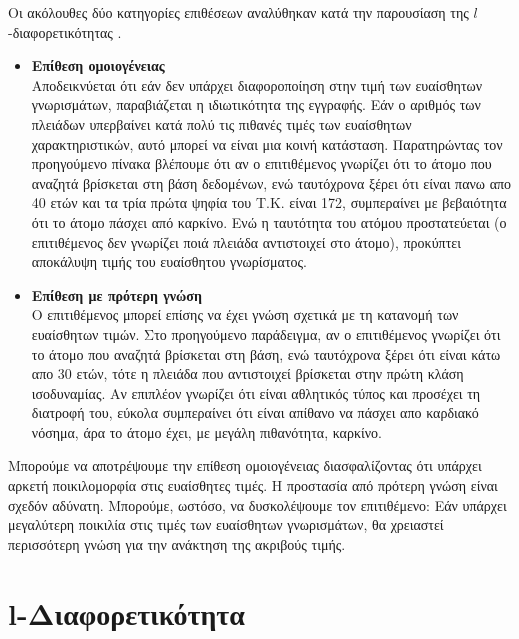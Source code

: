 Οι ακόλουθες δύο κατηγορίες επιθέσεων αναλύθηκαν κατά την παρουσίαση της $l$-διαφορετικότητας \textlatin{ \cite{machanavajjhala2006ell}}.

\begin{itemize}
    \item \textbf{Eπίθεση ομοιογένειας}\\
    Αποδεικνύεται ότι εάν δεν υπάρχει διαφοροποίηση στην τιμή των ευαίσθητων γνωρισμάτων, παραβιάζεται η ιδιωτικότητα της εγγραφής. Εάν ο αριθμός των πλειάδων υπερβαίνει κατά πολύ τις πιθανές τιμές των ευαίσθητων χαρακτηριστικών, αυτό μπορεί να είναι μια κοινή κατάσταση. Παρατηρώντας τον προηγούμενο πίνακα βλέπουμε ότι αν ο επιτιθέμενος γνωρίζει ότι το άτομο που αναζητά βρίσκεται στη βάση δεδομένων, ενώ ταυτόχρονα ξέρει ότι είναι πανω απο 40 ετών και τα τρία πρώτα ψηφία του Τ.Κ. είναι 172, συμπεραίνει με βεβαιότητα ότι το άτομο πάσχει από καρκίνο. Ενώ η ταυτότητα του ατόμου προστατεύεται (ο επιτιθέμενος δεν γνωρίζει ποιά πλειάδα αντιστοιχεί στο άτομο), προκύπτει αποκάλυψη τιμής του ευαίσθητου γνωρίσματος.
    
    \item \textbf{Επίθεση με πρότερη γνώση}\\
    Ο επιτιθέμενος μπορεί επίσης να έχει γνώση σχετικά με τη κατανομή των ευαίσθητων τιμών. Στο προηγούμενο παράδειγμα, αν ο επιτιθέμενος γνωρίζει ότι το άτομο που αναζητά βρίσκεται στη βάση, ενώ ταυτόχρονα ξέρει ότι είναι κάτω απο 30 ετών, τότε η πλειάδα που αντιστοιχεί βρίσκεται στην πρώτη κλάση ισοδυναμίας. Αν επιπλέον γνωρίζει ότι είναι αθλητικός τύπος και προσέχει τη διατροφή του, εύκολα συμπεραίνει ότι είναι απίθανο να πάσχει απο καρδιακό νόσημα, άρα το άτομο έχει, με μεγάλη πιθανότητα, καρκίνο.
\end{itemize}

Μπορούμε να αποτρέψουμε την επίθεση ομοιογένειας διασφαλίζοντας ότι υπάρχει αρκετή ποικιλομορφία στις ευαίσθητες τιμές. Η προστασία από πρότερη γνώση είναι σχεδόν αδύνατη. Μπορούμε, ωστόσο, να δυσκολέψουμε τον επιτιθέμενο: Εάν υπάρχει μεγαλύτερη ποικιλία στις τιμές των ευαίσθητων γνωρισμάτων, θα χρειαστεί περισσότερη γνώση για την ανάκτηση της ακριβούς τιμής.
\clearpage










\section{\textlatin{l}-Διαφορετικότητα}

